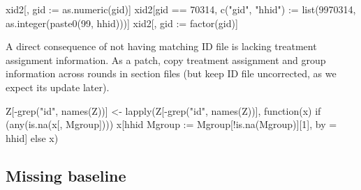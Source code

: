 \begin{Schunk}
\begin{Sinput}
xid2[, gid := as.numeric(gid)]
xid2[gid == 70314, c("gid", "hhid") := list(9970314, as.integer(paste0(99, hhid)))]
xid2[, gid := factor(gid)]
\end{Sinput}
\end{Schunk}

A direct consequence of not having matching ID file is lacking treatment assignment information. As a patch, copy treatment assignment and group information across rounds in section files (but keep ID file uncorrected, as we expect its update later).
\begin{Schunk}
\begin{Sinput}
Z[-grep("id", names(Z))] <- lapply(Z[-grep("id", names(Z))], 
	function(x) if (any(is.na(x[, Mgroup]))) 
	x[hhid %in% x[is.na(Mgroup), hhid], 
	Mgroup := Mgroup[!is.na(Mgroup)][1], by = hhid] else x)
\end{Sinput}
\end{Schunk}


\subsection{Missing baseline}



